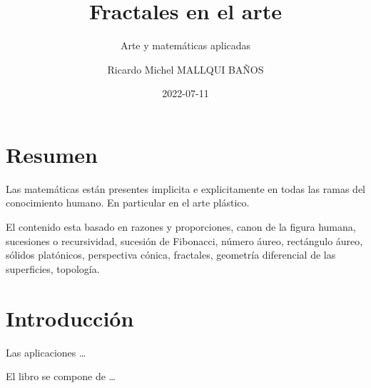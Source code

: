\documentclass[
  11pt,
]{krantz}
\title{Fractales en el arte}
\subtitle{Arte y matemáticas aplicadas}
\author{Ricardo Michel MALLQUI BAÑOS}
\date{2022-07-11}
\theoremstyle{definition}
\theoremstyle{definition}
\theoremstyle{definition}
\theoremstyle{definition}
\theoremstyle{remark}
\begin{document}
\maketitle

\thispagestyle{empty}
\begin{center}
\end{center}


{
\hypersetup{linkcolor=}
\setcounter{tocdepth}{2}
\tableofcontents
}
\listoftables
\listoffigures
\newcommand{\N}{\mathbb{N}}
\newcommand{\R}{\mathbb{R}}
\newcommand{\CC}{\mathbb{C}}
\newcommand{\I}{\mathbb{I}}
\newcommand{\f}{\mathbb{f}}
\newcommand{\X}{\mathbb{X}}
\newcommand{\D}{\mathbb{D}}
\newcommand{\Z}{\mathbb{Z}}
\newcommand{\Q}{\mathbb{Q}}
\newcommand{\norm}[1]{\left\Vert#1\right\Vert}
\newcommand{\abs}[1]{\left\vert#1\right\vert}
\newcommand{\set}[1]{\left\{#1\right\}}
\newcommand{\seq}[1]{\left<#1\right>}
\newcommand{\co}[1]{\left[#1\right]}
\newcommand{\cc}[1]{\left(#1\right)}
\newcommand{\J}{\mathcal{J}}
\newcommand{\K}{\mathcal{K}}
\newcommand{\M}{\mathcal{M}}
\newcommand{\F}{\mathcal{F}}

\hypertarget{resumen}{%
\chapter*{Resumen}\label{resumen}}


Las matemáticas están presentes implicita e explicitamente en todas las ramas del conocimiento humano. En particular en el arte plástico.

El contenido esta basado en razones y proporciones, canon de la figura humana, sucesiones o recursividad, sucesión de Fibonacci, número áureo, rectángulo áureo, sólidos platónicos, perspectiva cónica, fractales, geometría diferencial de las superficies, topología.

\hypertarget{introducciuxf3n}{%
\chapter*{Introducción}\label{introducciuxf3n}}


Las aplicaciones \ldots{}

El libro se compone de \ldots{}

\mainmatter
\end{document}
